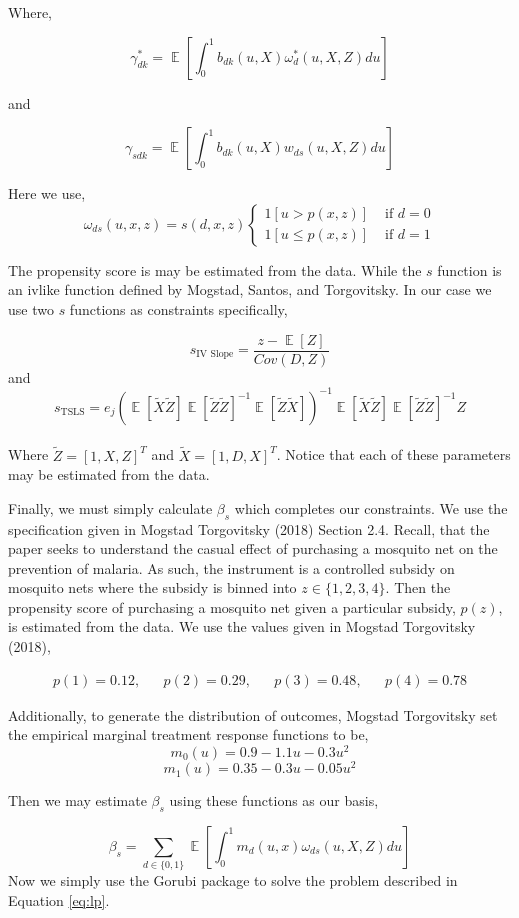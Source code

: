 \documentclass[dvip,11pt]{article}
\DeclareMathOperator{\?}{\,?\,}
\DeclareMathOperator{\E}{\mathbb{E}}
\begin{document}
Where, 

$$\gamma^*_{dk} = \E[\int_0^1b_{dk}(u,X)\omega_{d}^*(u,X,Z)du]$$

and 

$$\gamma_{sdk} = \E[\int_0^1b_{dk}(u,X)w_{ds}(u,X,Z)du]$$

Here we use, $$\omega_{ds}(u,x,z) = s(d,x,z)\begin{cases}1[u>p(x,z)]&\text{ if } d = 0\\1[u\leq p(x,z)]&\text{ if } d = 1\end{cases}$$

The propensity score is may be estimated from the data. While the $s$ function is an ivlike function defined by Mogstad, Santos, and Torgovitsky. In our case we use two $s$ functions as constraints specifically,

$$s_{\text{IV Slope}} = \frac{z-\E[Z]}{Cov(D,Z)}$$
and
$$s_{\text{TSLS}} = e_j(\E[\tilde{X}\tilde{Z}]\E[\tilde{Z}\tilde{Z}]^{-1}\E[\tilde{Z}\tilde{X}])^{-1}\E[\tilde{X}\tilde{Z}]\E[\tilde{Z}\tilde{Z}]^{-1}Z$$
\vspace{10pt}
\\Where $\tilde{Z} = [1,X,Z]^T$ and $\tilde{X} = [1,D,X]^T$. Notice that each of these parameters may be estimated from the data.

Finally, we must simply calculate $\beta_s$ which completes our constraints. We use the specification given in Mogstad Torgovitsky (2018) Section 2.4. Recall, that the paper seeks to understand the casual effect of purchasing a mosquito net on the prevention of malaria. As such, the instrument is a controlled subsidy on mosquito nets where the subsidy is binned into $z\in\{1,2,3,4\}$. Then the propensity score of purchasing a mosquito net given a particular subsidy, $p(z)$, is estimated from the data. We use the values given in Mogstad Torgovitsky (2018),

	$$\begin{aligned}p(1) = 0.12, && p(2)=0.29, && p(3)=0.48, && p(4)=0.78\end{aligned}$$

Additionally, to generate the distribution of outcomes, Mogstad Torgovitsky set the empirical marginal treatment response functions to be,
	$$m_0(u) = 0.9-1.1u-0.3u^2$$
	$$m_1(u) = 0.35-0.3u-0.05u^2$$

Then we may estimate $\beta_s$ using these functions as our basis,

$$\beta_s = \sum_{d\in\{0,1\}}\E[\int_0^1m_d(u,x)\omega_{ds}(u,X,Z)du]$$
Now we simply use the Gorubi package to solve the problem described in Equation \ref{eq:lp}.
\end{document}
